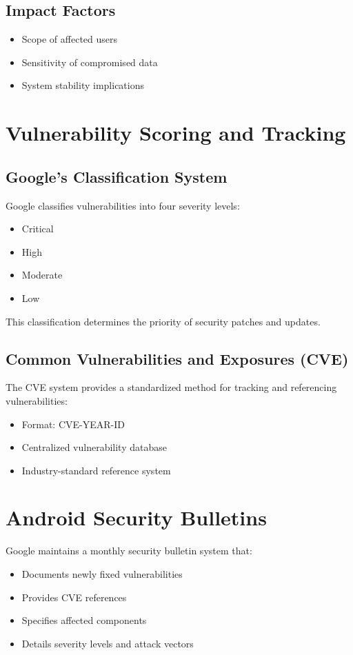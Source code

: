\documentclass{article}
\begin{document}
\subsection{Impact Factors}
\begin{itemize}
    \item Scope of affected users
    \item Sensitivity of compromised data
    \item System stability implications
\end{itemize}

\section{Vulnerability Scoring and Tracking}
\subsection{Google's Classification System}
Google classifies vulnerabilities into four severity levels:
\begin{itemize}
    \item Critical
    \item High
    \item Moderate
    \item Low
\end{itemize}

This classification determines the priority of security patches and updates.

\subsection{Common Vulnerabilities and Exposures (CVE)}
The CVE system provides a standardized method for tracking and referencing vulnerabilities:
\begin{itemize}
    \item Format: CVE-YEAR-ID
    \item Centralized vulnerability database
    \item Industry-standard reference system
\end{itemize}

\section{Android Security Bulletins}
Google maintains a monthly security bulletin system that:
\begin{itemize}
    \item Documents newly fixed vulnerabilities
    \item Provides CVE references
    \item Specifies affected components
    \item Details severity levels and attack vectors
\end{itemize}
\end{document}
